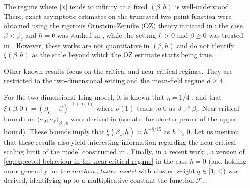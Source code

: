 \documentclass[10pt,a4paper]{amsart}
\numberwithin{equation}{section}
\begin{document}
The regime where $|x|$ tends to infinity at a fixed $(\beta,h)$ is well-understood. There, exact asymptotic estimates on the truncated two-point function were obtained using the rigorous Ornstein--Zernike (OZ) theory initiated in \cite{campanino2002ornstein}: the case $\beta<\beta_c$ and $h=0$ was studied in \cite{campanino2003ornstein}, while the setting $h>0$ and $\beta\geq 0$ was treated in \cite{ott2020sharp}. However, these works are not quantitative in $(\beta,h)$ and do not identify $\xi(\beta,h)$ as the scale beyond which the OZ estimate starts being true.

Other known results focus on the critical and near-critical regimes. They are restricted to the two-dimensional setting and the 
mean-field regime $d\geq 4$. 

For the two-dimensional Ising model, it is known that $\eta=1/4$ \cite{McCoyWu1973two}, and that $\xi(\beta,0)=(\beta_c-\beta)^{-1+o(1)}$ \cite{duminil2014near,McCoyWu1973two} where $o(1)$ tends to $0$ as $\beta\nearrow \beta_c$. Near-critical bounds on $\langle \sigma_0;\sigma_x\rangle_{\beta_c,h}$ were derived in \cite{CamiaJiangNewmanNearCritical2020,camia2020fk} (see also \cite{KlausenRaoufi2022,jiang2025simple} for shorter proofs of the upper bound). These bounds imply that $\xi(\beta_c,h)\asymp h^{-8/15}$ as $h\searrow 0$. Let us mention that these results also yield interesting information regarding the near-critical scaling limit of the model constructed in \cite{camia2016planar}. Finally, in a recent work \cite{dalimonte2025near}, a version of \eqref{eq:expected behaviour in the near-critical regime} in the case $h=0$ (and holding more generally for the \emph{random cluster model} with cluster weight $q\in [1,4)$) was derived, identifying up to a multiplicative constant the function $\mathcal F$.
\end{document}
